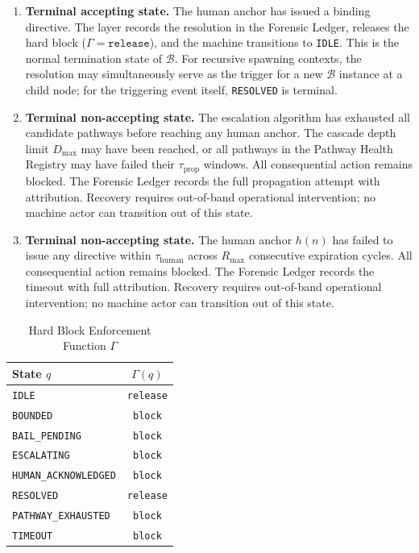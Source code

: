 \begin{enumerate}
\item[$\mathbf{\texttt{RESOLVED}}$] \textbf{Terminal accepting state.} The human anchor has issued a binding directive. The \fact{} layer records the resolution in the Forensic Ledger, releases the hard block ($\Gamma = \texttt{release}$), and the machine transitions to \texttt{IDLE}. This is the normal termination state of $\mathcal{B}$. For recursive spawning contexts, the resolution may simultaneously serve as the trigger for a new $\mathcal{B}$ instance at a child node; for the triggering event itself, \texttt{RESOLVED} is terminal.

\item[$\mathbf{\texttt{PATHWAY\_EXHAUSTED}}$] \textbf{Terminal non-accepting state.} The escalation algorithm has exhausted all candidate pathways before reaching any human anchor. The cascade depth limit $D_{\max}$ may have been reached, or all pathways in the Pathway Health Registry may have failed their $\tau_{\text{prop}}$ windows. All consequential action remains blocked. The Forensic Ledger records the full propagation attempt with attribution. Recovery requires out-of-band operational intervention; no machine actor can transition out of this state.

\item[$\mathbf{\texttt{TIMEOUT}}$] \textbf{Terminal non-accepting state.} The human anchor $h(n)$ has failed to issue any directive within $\tau_{\text{human}}$ across $R_{\max}$ consecutive expiration cycles. All consequential action remains blocked. The Forensic Ledger records the timeout with full attribution. Recovery requires out-of-band operational intervention; no machine actor can transition out of this state.
\end{enumerate}

\begin{table}[h]
\caption{Hard Block Enforcement Function $\Gamma$}
\label{tab:bp-block}
\small
\begin{tabular}{lc}
\toprule
\textbf{State $q$} & $\Gamma(q)$ \\
\midrule
\texttt{IDLE}                     & \texttt{release} \\
\texttt{BOUNDED}                  & \texttt{block} \\
\texttt{BAIL\_PENDING}            & \texttt{block} \\
\texttt{ESCALATING}               & \texttt{block} \\
\texttt{HUMAN\_ACKNOWLEDGED}     & \texttt{block} \\
\texttt{RESOLVED}                 & \texttt{release} \\
\texttt{PATHWAY\_EXHAUSTED}       & \texttt{block} \\
\texttt{TIMEOUT}                  & \texttt{block} \\
\bottomrule
\end{tabular}
\end{table}

